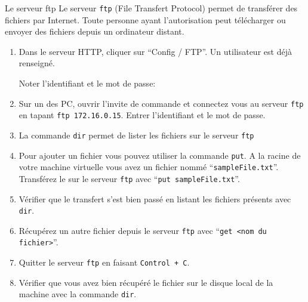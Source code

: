    \begin{exercice_cours}{}

        \begin{definition}{Le serveur ftp}{}
            Le serveur \verb+ftp+ (File Transfert Protocol) permet de transférer des fichiers par Internet. Toute personne ayant l'autorisation peut télécharger ou envoyer des fichiers depuis un ordinateur distant.
        \end{definition}

        \begin{enumerate}
            \item Dans le serveur HTTP, cliquer sur ``Config / FTP''. Un utilisateur est déjà renseigné. 
            
            Noter l'identifiant et le mot de passe: \dotfill
            \item Sur un des PC, ouvrir l'invite de commande et connectez vous au serveur \verb+ftp+ en tapant \verb+ftp 172.16.0.15+. Entrer l'identifiant et le mot de passe.
            \item La commande \verb+dir+ permet de lister les fichiers sur le serveur \verb+ftp+
            \item Pour ajouter un fichier vous pouvez utiliser la commande \verb+put+. A la racine de votre machine virtuelle vous avez un fichier nommé ``\verb+sampleFile.txt+''. Transférez le sur le serveur \verb+ftp+ avec ``\verb+put sampleFile.txt+''.
            \item Vérifier que le transfert s'est bien passé en listant les fichiers présents avec \verb+dir+.
            \item Récupérez un autre fichier depuis le serveur \verb+ftp+ avec ``\verb+get <nom du fichier>+''.
            \item Quitter le serveur \verb+ftp+ en faisant \verb-Control + C-.
            \item Vérifier que vous avez bien récupéré le fichier sur le disque local de la machine avec la commande \verb+dir+.
        \end{enumerate}
    \end{exercice_cours}

